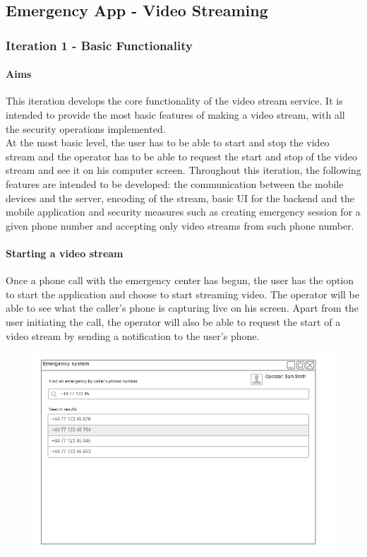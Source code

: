 \documentclass{article}
\begin{document}
\pagebreak
	\subsection{Emergency App - Video Streaming}
		\subsubsection{Iteration 1 - Basic Functionality}
			\paragraph{Aims}
			This iteration develops the core functionality of the video stream service. It is intended to provide the most basic features of making a video stream, with all the security operations implemented.\\

			At the most basic level, the user has to be able to start and stop the video stream and the operator has to be able to request the start and stop of the video stream and see it on his computer screen. Throughout this iteration, the following features are intended to be developed: the communication between the mobile devices and the server, encoding of the stream, basic UI for the backend and the mobile application and security measures such as creating emergency session for a given phone number and accepting only video streams from such phone number.
			
			\paragraph{Starting a video stream}
			Once a phone call with the emergency center has begun, the user has the option to start the application and choose to start streaming video. The operator will be able to see what the caller’s phone is capturing live on his screen. Apart from the user initiating the call, the operator will also be able to request the start of a video stream by sending a notification to the user’s phone.
	\begin{figure}[H]
		\centering
		\includegraphics[width=1\textwidth]{"EmergencyAppIteration1/iteration1backendsearch"}
	\end{figure}
	
\end{document}

